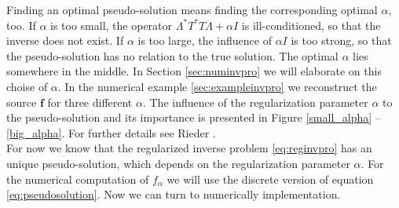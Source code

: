 \documentclass[a4paper, 11pt, twoside]{article}
\begin{document}
Finding an optimal pseudo-solution means finding the corresponding optimal $\alpha$, too. If $\alpha$ is too small, the operator $\Lambda^*T^*T\Lambda+\alpha I$ is ill-conditioned, so that the inverse does not exist. If $\alpha$ is too large, the influence of $\alpha I$ is too strong, so that the pseudo-solution has no relation to the true solution. The optimal $\alpha$ lies somewhere in the middle. In Section \ref{sec:numinvpro} we will elaborate on this choise of $\alpha$. In the numerical example \ref{sec:exampleinvpro} we reconstruct the source $\boldsymbol{f}$ for three different $\alpha$. The influence of the regularization parameter $\alpha$ to the pseudo-solution and its importance is presented in Figure \ref{small_alpha} -- \ref{big_alpha}. For further details see Rieder \cite{bib:rie03}.\\

For now we know that the regularized inverse problem \eqref{eq:reginvpro} has an unique pseudo-solution, which depends on the regularization parameter $\alpha$. For the numerical computation of $f_{\alpha}$ we will use the discrete version of equation \eqref{eq:pseudosolution}. Now we can turn to numerically implementation.
%
%
\end{document}
